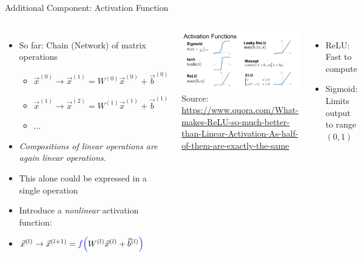 
\begin{frame}{Additional Component: Activation Function}
%
\begin{columns}[T]
\begin{itemize}
\item So far: Chain (Network) of matrix operations
	\begin{itemize}
	\item $\vec{x}^{(0)} \to \vec{x}^{(1)} = W^{(0)} \vec{x}^{(0)} + \vec{b}^{(0)}$
	\item $\vec{x}^{(1)} \to \vec{x}^{(2)} = W^{(1)} \vec{x}^{(1)} + \vec{b}^{(1)}$
	\item ...
	\end{itemize}
\item \emph{Compositions of linear operations are again linear operations.}
\item[\Thus] This alone could be expressed in a single operation
\item Introduce a \emph{nonlinear} activation function:
\item $\vec{x}^{(l)} \to \vec{x}^{(l + 1)} = {\color{blue} f \Big(} W^{(l)} \vec{x}^{(l)} + \vec{b}^{(l)} {\color{blue} \Big)}$ 
\end{itemize}
%
	\includegraphics[width=\linewidth]{./gfx/activationFuncs}
	{\scriptsize Source:}
	{\tiny \url{https://www.quora.com/What-makes-ReLU-so-much-better-than-Linear-Activation-As-half-of-them-are-exactly-the-same}}
%
\begin{itemize}
\item ReLU: Fast to compute
\item Sigmoid: Limits output to range $(0, 1)$
\end{itemize}
\end{columns}
%
\end{frame}

